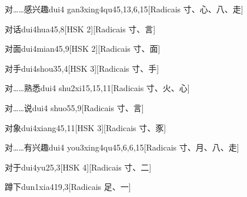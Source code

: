 \begin{entry}{对……感兴趣}{dui4 gan3xing4qu4}{5,13,6,15}[Radicais ⼨、⼼、⼋、⾛]
\end{entry}

\begin{entry}{对话}{dui4hua4}{5,8}[HSK 2][Radicais ⼨、⾔]
\end{entry}

\begin{entry}{对面}{dui4mian4}{5,9}[HSK 2][Radicais ⼨、⾯]
\end{entry}

\begin{entry}{对手}{dui4shou3}{5,4}[HSK 3][Radicais ⼨、⼿]
\end{entry}

\begin{entry}{对……熟悉}{dui4 shu2xi1}{5,15,11}[Radicais ⼨、⽕、⼼]
\end{entry}

\begin{entry}{对……说}{dui4 shuo5}{5,9}[Radicais ⼨、⾔]
\end{entry}

\begin{entry}{对象}{dui4xiang4}{5,11}[HSK 3][Radicais ⼨、⾗]
\end{entry}

\begin{entry}{对……有兴趣}{dui4 you3xing4qu4}{5,6,6,15}[Radicais ⼨、⽉、⼋、⾛]
\end{entry}

\begin{entry}{对于}{dui4yu2}{5,3}[HSK 4][Radicais ⼨、⼆]
\end{entry}

\begin{entry}{蹲下}{dun1xia4}{19,3}[Radicais ⾜、⼀]
\end{entry}

